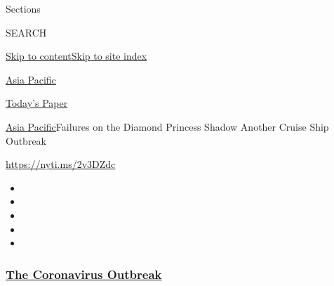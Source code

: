 Sections

SEARCH

\protect\hyperlink{site-content}{Skip to
content}\protect\hyperlink{site-index}{Skip to site index}

\href{https://www.nytimes3xbfgragh.onion/section/world/asia}{Asia
Pacific}

\href{https://myaccount.nytimes3xbfgragh.onion/auth/login?response_type=cookie\&client_id=vi}{}

\href{https://www.nytimes3xbfgragh.onion/section/todayspaper}{Today's
Paper}

\href{/section/world/asia}{Asia Pacific}\textbar{}Failures on the
Diamond Princess Shadow Another Cruise Ship Outbreak

\url{https://nyti.ms/2v3DZdc}

\begin{itemize}
\item
\item
\item
\item
\item
\end{itemize}

\hypertarget{the-coronavirus-outbreak}{%
\subsubsection{\texorpdfstring{\href{https://www.nytimes3xbfgragh.onion/news-event/coronavirus?name=styln-coronavirus-national\&region=TOP_BANNER\&variant=undefined\&block=storyline_menu_recirc\&action=click\&pgtype=Article\&impression_id=71016310-e395-11ea-9c33-7348c14ae8f8}{The
Coronavirus
Outbreak}}{The Coronavirus Outbreak}}\label{the-coronavirus-outbreak}}


